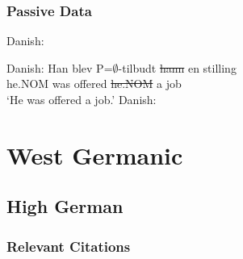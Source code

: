 \subsubsection{Passive Data}
\begin{exe}
	 Danish:

	 Danish:
	\gll Han blev P=$\emptyset$-tilbudt \sout{hann} en stilling\\
	he.NOM was offered \sout{he.NOM} a job\\
	\trans `He was offered a job.'
	 Danish:
	\begin{xlist}
	\end{xlist}
\end{exe}




\section{West Germanic}
\subsection{High German}

\subsubsection{Relevant Citations}
\cite{Shrier.1965,Lenerz.1977,Werner.1982,Hohle.1982,Webelhuth.1984,Scherpenisse.1986,Abraham.1986,Webelhuth.1989,Besten.1990,Czepluch.1990,Frey.1993,Lee.1994,Sprouse.1995,Draye.1996,Leirbukt.1997,Holmberg.1998,McGinnis.1998,Maling.2001,Frey.2001,Seiler.2001,Askedal.2001,Bayer.2001,Seiler.2003,McFadden.2004,Platzack.2005,McFadden.2006,Meinunger.2006,Eythorsson.2005,Bardal.2006,Fleischer.2006,Georgala.2011,Georgala.2011b,Alexiadou.2013b,Alexiadou.2014}
